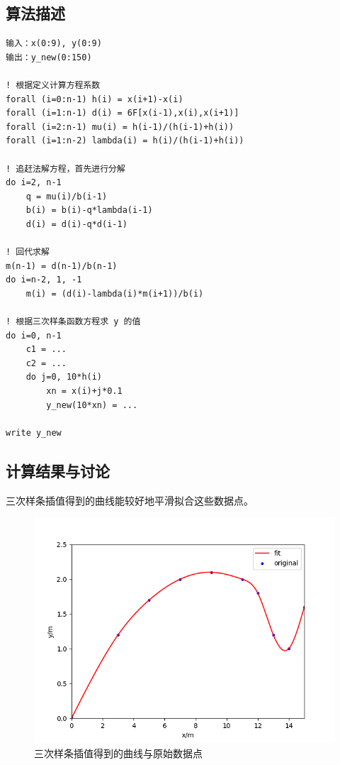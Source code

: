 \documentclass{ctexart}
\begin{document}
\subsection{算法描述}
\begin{lstlisting}
输入：x(0:9), y(0:9)
输出：y_new(0:150)

! 根据定义计算方程系数
forall (i=0:n-1) h(i) = x(i+1)-x(i)
forall (i=1:n-1) d(i) = 6F[x(i-1),x(i),x(i+1)]
forall (i=2:n-1) mu(i) = h(i-1)/(h(i-1)+h(i))
forall (i=1:n-2) lambda(i) = h(i)/(h(i-1)+h(i))

! 追赶法解方程，首先进行分解
do i=2, n-1
    q = mu(i)/b(i-1)
    b(i) = b(i)-q*lambda(i-1)
    d(i) = d(i)-q*d(i-1)

! 回代求解
m(n-1) = d(n-1)/b(n-1)
do i=n-2, 1, -1
    m(i) = (d(i)-lambda(i)*m(i+1))/b(i)

! 根据三次样条函数方程求 y 的值
do i=0, n-1
    c1 = ...
    c2 = ...
    do j=0, 10*h(i)
        xn = x(i)+j*0.1
        y_new(10*xn) = ...

write y_new
\end{lstlisting}
\subsection{计算结果与讨论}
三次样条插值得到的曲线能较好地平滑拟合这些数据点。
\begin{figure}[h]
\centering
\includegraphics[scale = 0.6]{spline.png}
\caption{三次样条插值得到的曲线与原始数据点}
\end{figure}
\end{document}
